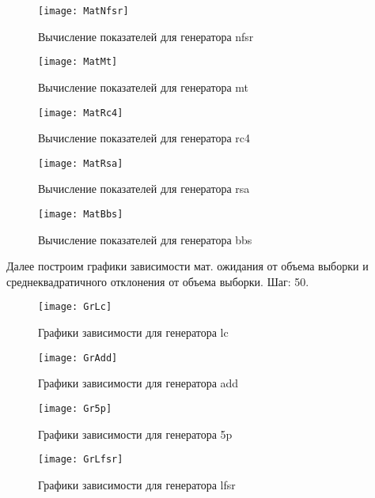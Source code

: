 \documentclass[bachelor, och, coursework]{shiza}
\begin{document}
	\begin{figure}[H]
		\centering
		\texttt{[image: MatNfsr]}
		\caption{Вычисление показателей для генератора nfsr}
		\label{fig:MatNfsr}
	\end{figure}
	
	\begin{figure}[H]
		\centering
		\texttt{[image: MatMt]}
		\caption{Вычисление показателей для генератора mt}
		\label{fig:MatMt}
	\end{figure}		
	
	\begin{figure}[H]
		\centering
		\texttt{[image: MatRc4]}
		\caption{Вычисление показателей для генератора rc4}
		\label{fig:MatRc4}
	\end{figure}
	
	\begin{figure}[H]
		\centering
		\texttt{[image: MatRsa]}
		\caption{Вычисление показателей для генератора rsa}
		\label{fig:MatRsa}
	\end{figure}
	
	\begin{figure}[H]
		\centering
		\texttt{[image: MatBbs]}
		\caption{Вычисление показателей для генератора bbs}
		\label{fig:MatBbs}
	\end{figure}	

	Далее построим графики зависимости мат. ожидания от объема выборки и среднеквадратичного отклонения от объема выборки. Шаг: 50.	
	
	\begin{figure}[H]
		\centering
		\texttt{[image: GrLc]}
		\caption{Графики зависимости для генератора lc}
		\label{fig:GrLc}
	\end{figure}
	
	\begin{figure}[H]
		\centering
		\texttt{[image: GrAdd]}
		\caption{Графики зависимости для генератора add}
		\label{fig:GrAdd}
	\end{figure}
	
	\begin{figure}[H]
		\centering
		\texttt{[image: Gr5p]}
		\caption{Графики зависимости для генератора 5p}
		\label{fig:Gr5p}
	\end{figure}	
	
	\begin{figure}[H]
		\centering
		\texttt{[image: GrLfsr]}
		\caption{Графики зависимости для генератора lfsr}
		\label{fig:GrLfsr}
	\end{figure}
	
\end{document}
